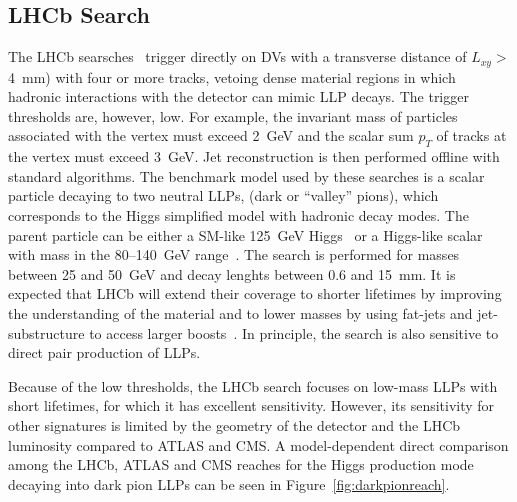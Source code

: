\subsection{LHCb Search}

The LHCb searsches~\cite{Aaij:2016isa,Aaij:2017mic} trigger directly on DVs with a transverse distance of $L_{xy} >$ 4~mm) with four or more tracks, vetoing dense material regions in which hadronic interactions with the detector can mimic LLP decays. The trigger thresholds are, however, low. For example, the invariant mass of particles associated with the vertex must exceed 2~GeV and the scalar sum $p_T$ of tracks at the vertex must exceed 3~GeV. Jet reconstruction is then performed offline with standard algorithms. The benchmark model used by these searches is a scalar particle decaying to two neutral LLPs, \piv (dark or ``valley'' pions), which corresponds to the Higgs simplified model with hadronic decay modes. The parent particle can be either a SM-like 125~GeV Higgs~\cite{Aaij:2017mic} or a Higgs-like scalar with mass in the 80--140~GeV range~\cite{Aaij:2016isa}. The search is performed for \piv masses between 25 and 50~GeV and decay lenghts between 0.6 and 15~mm. It is expected that LHCb will extend their coverage to shorter lifetimes by improving the understanding of the material and to lower masses by using fat-jets and jet-substructure to access larger boosts~\cite{Vaszquez:2017workshop}. In principle, the search is also sensitive to direct pair production of LLPs.

Because of the low thresholds, the LHCb search focuses on low-mass LLPs with short lifetimes, for which it has excellent sensitivity. However, its sensitivity for other signatures is limited by the geometry of the detector and the LHCb luminosity compared to ATLAS and CMS. A model-dependent direct comparison among the LHCb, ATLAS and CMS reaches for the Higgs production mode decaying into dark pion LLPs can be seen in Figure~\ref{fig:darkpionreach}.


